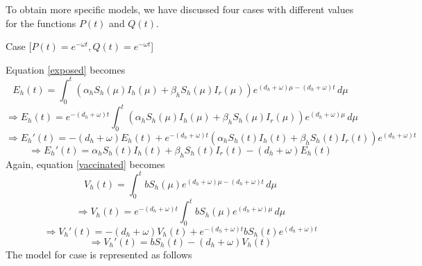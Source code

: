 To obtain more specific models, we have discussed four cases with different values for the functions $P(t)$ and $Q(t)$.

Case  [$P(t)=e^{-\omega t}, Q(t)=e^{-\omega t}$]

Equation \ref{exposed} becomes
\[E_{h}(t) = \int_{0}^{t} (\alpha_{h}S_{h}(\mu)I_{h}(\mu) + \beta_{h}S_{h}(\mu)I_{r}(\mu)) e^{(d_{h}+\omega)\mu-(d_{h}+\omega)t} \,d\mu\]
\[\Rightarrow E_{h}(t) = e^{-(d_{h}+\omega)t}\int_{0}^{t} (\alpha_{h}S_{h}(\mu)I_{h}(\mu) + \beta_{h}S_{h}(\mu)I_{r}(\mu)) e^{(d_{h}+\omega)\mu} \,d\mu\]
\[\Rightarrow E_{h}'(t) = -(d_{h}+\omega)E_{h}(t) + e^{-(d_{h}+\omega)t}(\alpha_{h}S_{h}(t)I_{h}(t) + \beta_{h}S_{h}(t)I_{r}(t)) e^{(d_{h}+\omega)t}\]
\[\Rightarrow E_{h}'(t) = \alpha_{h}S_{h}(t)I_{h}(t) + \beta_{h}S_{h}(t)I_{r}(t)-(d_{h}+\omega)E_{h}(t)\]
Again, equation \ref{vaccinated} becomes
\[V_{h}(t) = \int_{0}^{t} bS_{h}(\mu)e^{(d_{h}+\omega)\mu-(d_{h}+\omega)t} \,d\mu\]
\[\Rightarrow V_{h}(t) = e^{-(d_{h}+\omega)t}\int_{0}^{t} bS_{h}(\mu) e^{(d_{h}+\omega)\mu} \,d\mu\]
\[\Rightarrow V_{h}'(t) = -(d_{h}+\omega)V_{h}(t) + e^{-(d_{h}+\omega)t}bS_{h}(t) e^{(d_{h}+\omega)t}\]
\[\Rightarrow V_{h}'(t) = bS_{h}(t)-(d_{h}+\omega)V_{h}(t)\]
The model for case  is represented as follows
